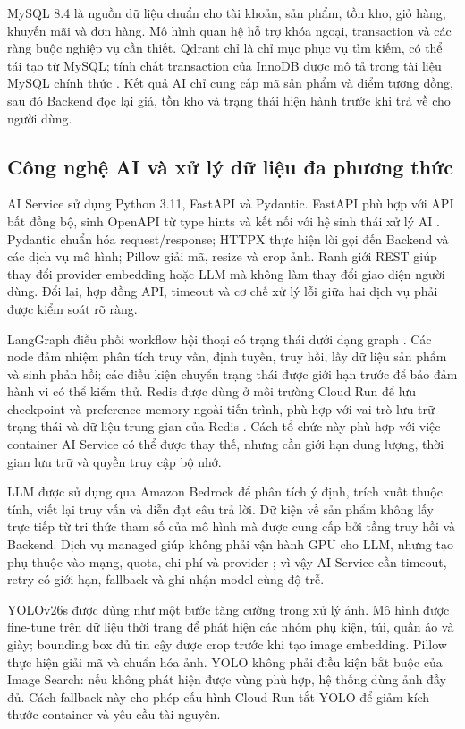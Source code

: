 MySQL 8.4 là nguồn dữ liệu chuẩn cho tài khoản, sản phẩm, tồn kho, giỏ hàng, khuyến
mãi và đơn hàng. Mô hình quan hệ hỗ trợ khóa ngoại, transaction và các ràng buộc
nghiệp vụ cần thiết. Qdrant chỉ là chỉ mục phục vụ tìm kiếm, có thể tái tạo từ MySQL;
tính chất transaction của InnoDB được mô tả trong tài liệu MySQL chính thức
\parencite{mysqlinnodb2026}. Kết quả AI chỉ cung cấp mã sản phẩm và điểm tương đồng,
sau đó Backend đọc lại giá,
tồn kho và trạng thái hiện hành trước khi trả về cho người dùng.

\subsection{Công nghệ AI và xử lý dữ liệu đa phương thức}

AI Service sử dụng Python 3.11, FastAPI và Pydantic. FastAPI phù hợp với API bất đồng
bộ, sinh OpenAPI từ type hints và kết nối với hệ sinh thái xử lý AI \parencite{fastapidocs2024}.
Pydantic chuẩn hóa request/response; HTTPX thực hiện lời gọi đến Backend và các dịch
vụ mô hình; Pillow giải mã, resize và crop ảnh. Ranh giới REST giúp thay đổi provider
embedding hoặc LLM mà không làm thay đổi giao diện người dùng. Đổi lại, hợp đồng API,
timeout và cơ chế xử lý lỗi giữa hai dịch vụ phải được kiểm soát rõ ràng.

LangGraph điều phối workflow hội thoại có trạng thái dưới dạng graph
\parencite{langgraph2024docs}. Các node đảm nhiệm phân tích truy vấn, định tuyến,
truy hồi, lấy dữ liệu sản phẩm và sinh phản hồi; các điều kiện chuyển trạng thái được
giới hạn trước để bảo đảm hành vi có thể kiểm thử. Redis được dùng ở môi trường Cloud
Run để lưu checkpoint và preference memory ngoài tiến trình, phù hợp với vai trò lưu
trữ trạng thái và dữ liệu trung gian của Redis \parencite{redisdocs2026}. Cách tổ chức này phù hợp
với việc container AI Service có thể được thay thế, nhưng cần giới hạn dung lượng,
thời gian lưu trữ và quyền truy cập bộ nhớ.

LLM được sử dụng qua Amazon Bedrock để phân tích ý định, trích xuất thuộc tính, viết
lại truy vấn và diễn đạt câu trả lời. Dữ kiện về sản phẩm không lấy trực tiếp từ tri
thức tham số của mô hình mà được cung cấp bởi tầng truy hồi và Backend. Dịch vụ managed
giúp không phải vận hành GPU cho LLM, nhưng tạo phụ thuộc vào mạng, quota, chi phí và
provider \parencite{awsbedrockdocs2026}; vì vậy AI Service cần timeout, retry có giới hạn,
fallback và ghi nhận model cùng độ trễ.

YOLOv26s được dùng như một bước tăng cường trong xử lý ảnh. Mô hình được fine-tune
trên dữ liệu thời trang để phát hiện các nhóm phụ kiện, túi, quần áo và giày; bounding
box đủ tin cậy được crop trước khi tạo image embedding. Pillow thực hiện giải mã và
chuẩn hóa ảnh. YOLO không phải điều kiện bắt buộc của Image Search: nếu không phát
hiện được vùng phù hợp, hệ thống dùng ảnh đầy đủ. Cách fallback này cho phép cấu hình
Cloud Run tắt YOLO để giảm kích thước container và yêu cầu tài nguyên.

